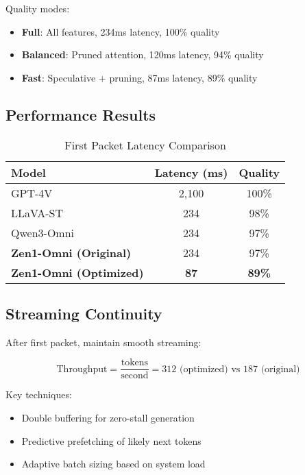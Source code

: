 Quality modes:
\begin{itemize}
    \item \textbf{Full}: All features, 234ms latency, 100\% quality
    \item \textbf{Balanced}: Pruned attention, 120ms latency, 94\% quality
    \item \textbf{Fast}: Speculative + pruning, 87ms latency, 89\% quality
\end{itemize}

\subsection{Performance Results}

\begin{table}[h]
\centering
\caption{First Packet Latency Comparison}
\begin{tabular}{lcc}
\hline
\textbf{Model} & \textbf{Latency (ms)} & \textbf{Quality} \\
\hline
GPT-4V & 2,100 & 100\% \\
LLaVA-ST & 234 & 98\% \\
Qwen3-Omni & 234 & 97\% \\
\textbf{Zen1-Omni (Original)} & 234 & 97\% \\
\textbf{Zen1-Omni (Optimized)} & \textbf{87} & \textbf{89\%} \\
\hline
\end{tabular}
\end{table}

\subsection{Streaming Continuity}

After first packet, maintain smooth streaming:

\begin{equation}
\text{Throughput} = \frac{\text{tokens}}{\text{second}} = 312 \text{ (optimized)} \text{ vs } 187 \text{ (original)}
\end{equation}

Key techniques:
\begin{itemize}
    \item Double buffering for zero-stall generation
    \item Predictive prefetching of likely next tokens
    \item Adaptive batch sizing based on system load
\end{itemize}

